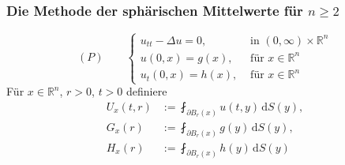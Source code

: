 \subsubsection{Die Methode der sphärischen Mittelwerte für $n \geq 2$} 
\label{ssub:die_methode_der_spharischen_mittelwerte_fur_n_geq_2}
\[
	(P) \qquad  \begin{cases}
		u_{tt}- \Delta u = 0, &\text{ in }(0,\infty) \times \mathbb{R}^n\\
		u(0,x) = g(x), &\text{ für } x \in \mathbb{R}^n \\
		u_t(0,x)=h(x), &\text{ für } x \in \mathbb{R}^n
		\end{cases}
\]
Für $x \in \mathbb{R}^n$, $r>0$, $t>0$ definiere
\begin{align*}
	U_x(t,r) &:= \fint_{\partial B_r(x)}^{} u(t,y) \,\mathrm{d}S(y), \\
	G_x(r) &:= \fint_{\partial B_r(x)}^{} g(y) \,\mathrm{d}S(y), \\
	H_x(r) &:= \fint_{\partial B_r(x)}^{} h(y) \,\mathrm{d}S(y)
\end{align*}

